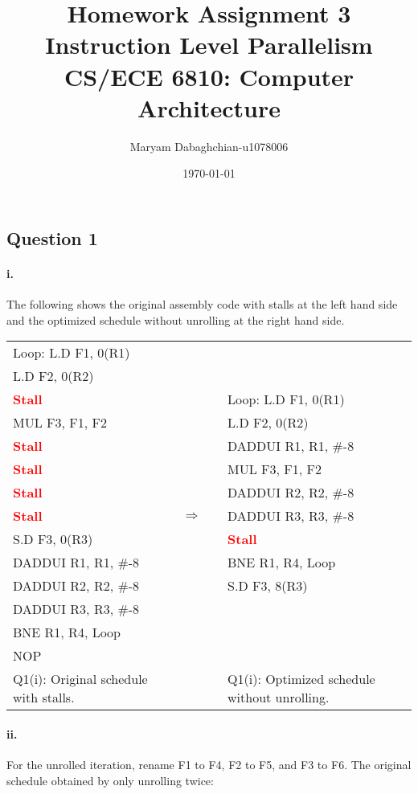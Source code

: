 \documentclass[11pt]{article}
\title{Homework Assignment 3\\
	Instruction Level Parallelism\\
	CS/ECE 6810: Computer Architecture}
\author{Maryam Dabaghchian-u1078006}
\date{\today}
\newcommand{\q}[1]{\subsection*{Question {#1}}}
\renewcommand{\part}[1]{\paragraph*{{#1}.}}
\newcommand{\code}[1]{\textsf{#1}}
\newcommand{\stall}{\textcolor{red}{\textbf{Stall}}}
\begin{document}
\maketitle

\q{1} 

\part{i} The following shows the original assembly code with stalls at the left hand side and the optimized schedule without unrolling at the right hand side.


\begin{table}[h]
\center
\begin{tabular}{lcccl}
	 \code{Loop:} \code{L.D F1, 0(R1)} & & & &  \\
	 \code{L.D F2, 0(R2)}  & & & & \\
	 \stall &  & & &  \code{Loop:} \code{L.D F1, 0(R1)} \\
	 \code{MUL F3, F1, F2}  & & & & \code{L.D F2, 0(R2)} \\
	 \stall &  & & & \code{DADDUI R1, R1, \#-8} \\
	 \stall & & & & \code{MUL F3, F1, F2}  \\
	 \stall & & & & \code{DADDUI R2, R2, \#-8}  \\
	 \stall & & $\Rightarrow$ & & \code{DADDUI R3, R3, \#-8}  \\
	 \code{S.D F3, 0(R3)} & & & & \stall  \\
	 \code{DADDUI R1, R1, \#-8} & & & &  \code{BNE R1, R4, Loop} \\
	 \code{DADDUI R2, R2, \#-8} & & & &  \code{S.D F3, 8(R3)} \\
	 \code{DADDUI R3, R3, \#-8} & & & &   \\
	 \code{BNE R1, R4, Loop} & & & &  \\
	 \code{NOP} & & & &  \\
	 Q1(i): Original schedule with stalls. & & & & Q1(i): Optimized schedule without unrolling.
\end{tabular}
\label{tbl:q1p1}
\end{table}


\part{ii} 
For the unrolled iteration, rename \code{F1} to \code{F4}, \code{F2} to \code{F5}, and \code{F3} to \code{F6}. The original schedule obtained by only unrolling twice:
\end{document}
